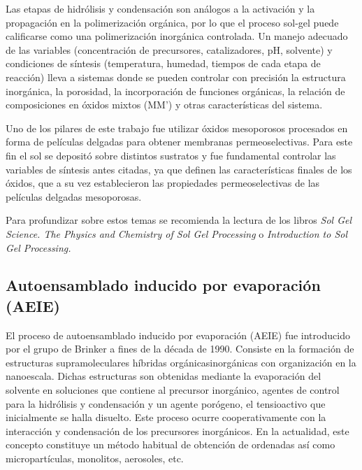 	 Las etapas de hidrólisis y condensación son análogos a la activación y la propagación en la polimerización orgánica, por lo que el proceso sol-gel puede calificarse como una polimerización inorgánica controlada. Un manejo adecuado de las variables (concentración de precursores, catalizadores, pH, solvente) y condiciones de síntesis (temperatura, humedad, tiempos de cada etapa de reacción) lleva a sistemas donde se pueden controlar con precisión  la estructura inorgánica, la porosidad, la incorporación de funciones orgánicas, la relación de composiciones en óxidos mixtos (MM') y otras características del sistema.

	 Uno de los pilares de este trabajo fue utilizar óxidos mesoporosos procesados en forma de películas delgadas para obtener membranas permeoselectivas. Para este fin el sol se depositó sobre distintos sustratos y fue fundamental controlar las variables de síntesis antes citadas, ya que definen las características finales de los óxidos, que a su vez establecieron las propiedades permeoselectivas de las películas delgadas mesoporosas.

	 Para profundizar sobre estos temas se recomienda la lectura de los libros \textit{Sol Gel Science. The Physics and Chemistry of Sol Gel Processing}\cite{Wright2001} o \textit{Introduction to Sol Gel Processing.} \cite{Pierre1998} 
	
	\subsection{Autoensamblado inducido por evaporación (AEIE)}

	 El proceso de autoensamblado inducido por evaporación (AEIE) fue introducido por el grupo de Brinker a fines de la década de 1990.\cite{Lu1997,Brinker1999} Consiste en la formación de estructuras supramoleculares híbridas orgánicas\textbar inorgánicas con organización en la nanoescala. Dichas estructuras son obtenidas mediante la evaporación del solvente en soluciones que contiene al precursor inorgánico, agentes de control para la hidrólisis y condensación y un agente porógeno, el tensioactivo que inicialmente se halla disuelto. Este proceso ocurre cooperativamente con la interacción y condensación de los precursores inorgánicos. En la actualidad, este concepto constituye un método habitual de obtención de \pdm\space ordenadas\cite{Grosso2004} así como micropartículas, monolitos, aerosoles, etc.\cite{Yang1998a}


